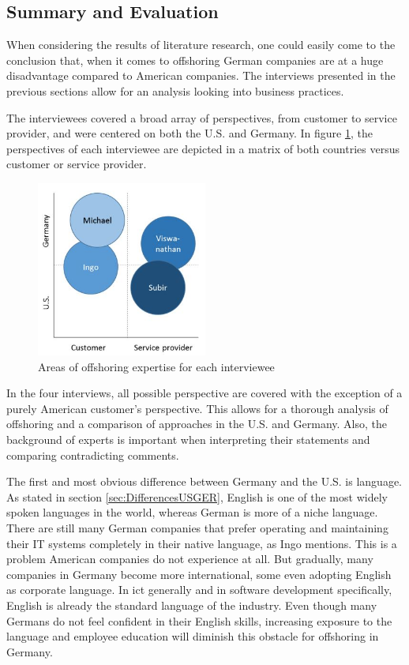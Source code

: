 \subsection{Summary and Evaluation}
\label{sec:Summary}
When considering the results of literature research, one could easily come to the conclusion that, when it comes to offshoring German companies are at a huge disadvantage compared to American companies. The interviews presented in the previous sections allow for an analysis looking into business practices. 

The interviewees covered a broad array of perspectives, from customer to service provider, and were centered on both the U.S. and Germany. In figure \ref{fig:Viewpoints}, the perspectives of each interviewee are depicted in a matrix of both countries versus customer or service provider. 

\begin{figure}[htb]
		\centering
		\includegraphics[width=0.5\textwidth]{Pictures/Viewpoints}
		\caption{Areas of offshoring expertise for each interviewee}
		\label{fig:Viewpoints}
\end{figure}

In the four interviews, all possible perspective are covered with the exception of a purely American customer's perspective. This allows for a thorough analysis of offshoring and a comparison of approaches in the U.S. and Germany. Also, the background of experts is important when interpreting their statements and comparing contradicting comments.

The first and most obvious difference between Germany and the U.S. is language. As stated in section \ref{sec:DifferencesUSGER}, English is one of the most widely spoken languages in the world, whereas German is more of a niche language. There are still many German companies that prefer operating and maintaining their IT systems completely in their native language, as Ingo mentions. This is a problem American companies do not experience at all. But gradually, many companies in Germany become more international, some even adopting English as corporate language. In \gls{ict} generally and in software development specifically, English is already the standard language of the industry. Even though many Germans do not feel confident in their English skills, increasing exposure to the language and employee education will diminish this obstacle for offshoring in Germany.

